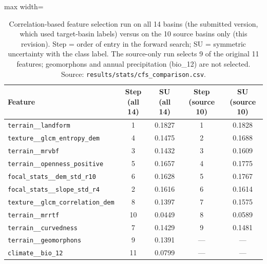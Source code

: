 \begin{table}[ht]
    \centering
    \caption{Correlation-based feature selection run on all 14 basins (the submitted version, which used target-basin labels) versus on the 10 source basins only (this revision). Step = order of entry in the forward search; SU = symmetric uncertainty with the class label. The source-only run selects 9 of the original 11 features; geomorphons and annual precipitation (bio\_12) are not selected. Source: \texttt{results/stats/cfs\_comparison.csv}.}
    \label{tab:cfs_comparison}
    \footnotesize
    \begin{adjustbox}{max width=\linewidth}
    \begin{tabular}{lcccc}
        \toprule
        \textbf{Feature} & \textbf{Step (all 14)} & \textbf{SU (all 14)} & \textbf{Step (source 10)} & \textbf{SU (source 10)} \\
        \midrule
        \texttt{terrain\_\_landform} & 1 & 0.1827 & 1 & 0.1828 \\
        \texttt{texture\_\_glcm\_entropy\_dem} & 4 & 0.1475 & 2 & 0.1688 \\
        \texttt{terrain\_\_mrvbf} & 3 & 0.1432 & 3 & 0.1609 \\
        \texttt{terrain\_\_openness\_positive} & 5 & 0.1657 & 4 & 0.1775 \\
        \texttt{focal\_stats\_\_dem\_std\_r10} & 6 & 0.1628 & 5 & 0.1767 \\
        \texttt{focal\_stats\_\_slope\_std\_r4} & 2 & 0.1616 & 6 & 0.1614 \\
        \texttt{texture\_\_glcm\_correlation\_dem} & 8 & 0.1397 & 7 & 0.1575 \\
        \texttt{terrain\_\_mrrtf} & 10 & 0.0449 & 8 & 0.0589 \\
        \texttt{terrain\_\_curvedness} & 7 & 0.1429 & 9 & 0.1481 \\
        \texttt{terrain\_\_geomorphons} & 9 & 0.1391 & — & — \\
        \texttt{climate\_\_bio\_12} & 11 & 0.0799 & — & — \\
        \bottomrule
    \end{tabular}
    \end{adjustbox}
\end{table}

